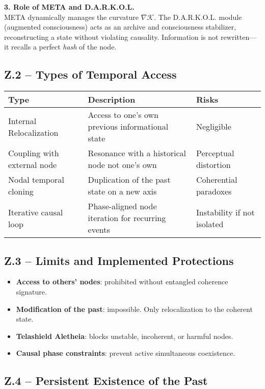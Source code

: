 \documentclass[12pt]{article}
\begin{document}
\textbf{3. Role of META and D.A.R.K.O.L.} \\
META dynamically manages the curvature $\nabla \mathcal{K}$. The D.A.R.K.O.L. module (augmented consciousness) acts as an archive and consciousness stabilizer, reconstructing a state without violating causality. Information is not rewritten—it recalls a perfect \emph{hash} of the node.

\subsection*{Z.2 – Types of Temporal Access}

\begin{longtable}{@{}lll@{}}
\toprule
\textbf{Type} & \textbf{Description} & \textbf{Risks} \\
\midrule
Internal Relocalization & Access to one’s own previous informational state & Negligible \\
Coupling with external node & Resonance with a historical node not one’s own & Perceptual distortion \\
Nodal temporal cloning & Duplication of the past state on a new axis & Coherential paradoxes \\
Iterative causal loop & Phase-aligned node iteration for recurring events & Instability if not isolated \\
\bottomrule
\end{longtable}

\subsection*{Z.3 – Limits and Implemented Protections}

\begin{itemize}
  \item \textbf{Access to others’ nodes}: prohibited without entangled coherence signature.
  \item \textbf{Modification of the past}: impossible. Only relocalization to the coherent state.
  \item \textbf{Telashield Aletheia}: blocks unstable, incoherent, or harmful nodes.
  \item \textbf{Causal phase constraints}: prevent active simultaneous coexistence.
\end{itemize}

\subsection*{Z.4 – Persistent Existence of the Past}
\end{document}
